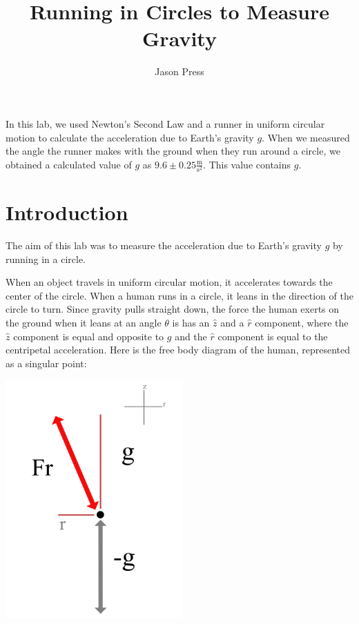 \documentclass[12pt]{article}
\author{Jason Press}
\date{}
\title{Running in Circles to Measure Gravity}
\begin{document}
\maketitle
\begin{ABSTRACT}


In this lab, we used Newton's Second Law and a runner in uniform circular motion to calculate the acceleration due to Earth's gravity \(g\). When we measured the angle the runner makes with the ground when they run around a circle, we obtained a calculated value of \(g\) as \(9.6 \pm 0.25 \frac{\text{m}}{\text{s}^{2}}\). This value contains \(g\).
\end{ABSTRACT}
\section{Introduction}
\label{sec:org59e40f4}

The aim of this lab was to measure the acceleration due to Earth's gravity \(g\) by running in a circle.

When an object travels in uniform circular motion, it accelerates towards the center of the circle. When a human runs in a circle, it leans in the direction of the circle to turn. Since gravity pulls straight down, the force the human exerts on the ground when it leans at an angle \(\theta\) is has an \(\hat{z}\) and a \(\hat{r}\) component, where the \(\hat{z}\) component is equal and opposite to \(g\) and the \(\hat{r}\) component is equal to the centripetal acceleration. Here is the free body diagram of the human, represented as a singular point:

\begin{center}
\includegraphics[height=3.6in]{./bodyfbd.png}
\end{center}
\end{document}
